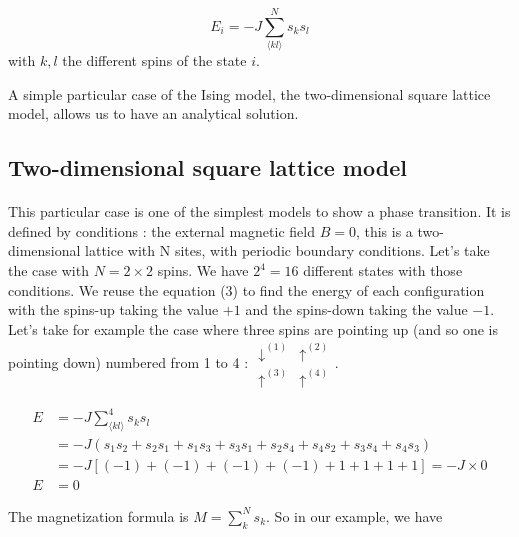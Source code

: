 \documentclass[a4paper, twoside, 11pt]{report}
\theoremstyle{theorem}
\theoremstyle{remark}
\theoremstyle{exemple}
\begin{document}
                \begin{equation*}
                    E_i = -J \sum\limits_{\langle kl \rangle}^{N}s_ks_l 
                    \tag{3}
                \end{equation*}
            with $k,l$ the different spins of the state $i$.
                
            A simple particular case of the Ising model, the two-dimensional square lattice model, allows us to have an analytical solution. 
        
        \subsection{Two-dimensional square lattice model}
        
            \paragraph{}This particular case is one of the simplest models to show a phase transition. It is defined by conditions : the external magnetic field $B=0$, this is a two-dimensional lattice with N sites, with periodic boundary conditions. Let's take the case with $N=2\times2$ spins. We have $2^4 = 16$ different states with those conditions. We reuse the equation (3) to find the energy of each configuration with the spins-up taking the value $+1$ and the spins-down taking the value $-1$. Let's take for example the case where three spins are pointing up (and so one is pointing down) numbered from 1 to 4 :
                $\begin{matrix}
                    \downarrow ^{(1)} & \uparrow ^{(2)}\\
                    \uparrow ^{(3)} & \uparrow ^{(4)}
                \end{matrix}$.
                
                \begin{align*}
                    E &= -J \sum\limits_{\langle kl \rangle}^{4}s_ks_l \\
                      &= -J (s_1s_2 + s_2s_1 + s_1s_3 + s_3s_1 + s_2s_4 + s_4s_2 + s_3s_4 + s_4s_3) \\
                      &= -J \left[(-1) + (-1) + (-1) + (-1) + 1 + 1 + 1 + 1\right] = -J \times 0 \\
                    E &= 0 
                \end{align*}
                
            The magnetization formula is $\displaystyle M = \sum\limits_{k}^{N} s_k$. So in our example, we have 
                
\end{document}
